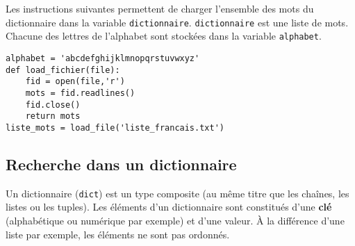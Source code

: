 Les instructions suivantes permettent de charger l'ensemble des mots du dictionnaire dans la variable \texttt{dictionnaire}. \texttt{dictionnaire} est une liste de mots. Chacune des lettres de l'alphabet sont stockées dans la variable \texttt{alphabet}.

\begin{lstlisting}
alphabet = 'abcdefghijklmnopqrstuvwxyz'
def load_fichier(file):
    fid = open(file,'r')
    mots = fid.readlines()
    fid.close()
    return mots
liste_mots = load_file('liste_francais.txt')
\end{lstlisting}




%
%


\subsection*{Recherche dans un dictionnaire}

Un dictionnaire (\texttt{dict}) est un type composite (au même titre que les chaînes, les listes ou les tuples). Les éléments d'un dictionnaire sont constitués d'une \textbf{clé} (alphabétique ou numérique par exemple) et d'une valeur. À la différence d'une liste par exemple, les éléments ne sont pas ordonnés.

